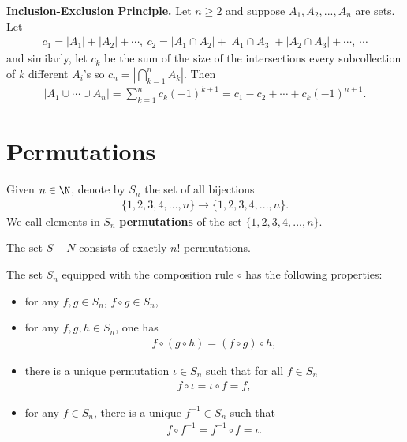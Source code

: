 \documentclass{article}
\begin{document}
\begin{theorem}
    \textbf{Inclusion-Exclusion Principle.} Let $n\geq 2$ and suppose $A_1, A_2, ..., A_n$ are sets. Let
    \begin{align*}
        c_1=|A_1|+|A_2|+\cdots,\:c_2=|A_1\cap A_2|+|A_1\cap A_3|+|A_2\cap A_3|+\cdots,\:\cdots
    \end{align*}
    and similarly, let $c_k$ be the sum of the size of the intersections every subcollection of $k$ different $A_i$'s so $c_n=|\bigcap_{k=1}^n A_k|$. Then
    \begin{align*}
        |A_1\cup \cdots \cup A_n| = \sum_{k=1}^n c_k (-1)^{k+1}=c_1-c_2+\cdots +c_k (-1)^{n+1}.
    \end{align*}
\end{theorem}
\section{Permutations}
\begin{definition}
    Given $n\in\N$, denote by $S_n$ the set of all bijections
    \begin{align*}
        \{1,2,3,4,...,n\}\to\{1,2,3,4,...,n\}.
    \end{align*}
    We call elements in $S_n$ \textbf{permutations} of the set $\{1,2,3,4,...,n\}$.
\end{definition}
\begin{lemma}
    The set $S-N$ consists of exactly $n!$ permutations.
\end{lemma}
\begin{lemma}
    The set $S_n$ equipped with the composition rule $\circ$ has the following properties:
    \begin{itemize}
        \item for any $f,g\in S_n$, $f\circ g\in S_n$,
        \item for any $f,g,h\in S_n$, one has
        \begin{align*}
            f\circ \left(g\circ h\right)=\left(f\circ g\right)\circ h,
        \end{align*}
        \item there is a unique permutation $\iota \in S_n$ such that for all $f\in S_n$
        \begin{align*}
            f\circ \iota = \iota \circ f = f,
        \end{align*}
        \item for any $f\in S_n$, there is a unique $f^{-1}\in S_n$ such that
        \begin{align*}
            f\circ f^{-1}=f^{-1}\circ f = \iota.
        \end{align*}
    \end{itemize}
\end{lemma}
\end{document}

